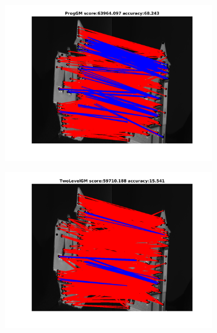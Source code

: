 \begin{figure}[h]	
	\begin{subfigure}[b]{0.3\textwidth}
		\centering
		\includegraphics[scale=0.25]{"chapter3/fig/HouseSeq/anchor_descr/using_cpd_afftrafo/ext_solution/fi_11_ProgGM"}  
	\end{subfigure}%
	\begin{subfigure}[b]{0.3\textwidth}
		\centering
		\includegraphics[scale=0.25]{"chapter3/fig/HouseSeq/anchor_descr/using_cpd_afftrafo/ext_solution/fi_11_TwoLevelGM"}  
	\end{subfigure} 
	\begin{subfigure}[b]{0.3\textwidth}
		\centering

\end{subfigure}
\end{figure}
